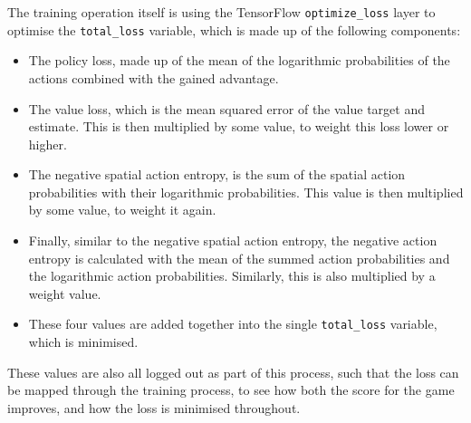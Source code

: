 The training operation itself is using the TensorFlow \texttt{optimize\_loss}
layer to optimise the \texttt{total\_loss} variable, which is made up of the
following components:

\begin{itemize}
    \item The policy loss, made up of the mean of the logarithmic probabilities of the
        actions combined with the gained advantage.
    \item The value loss, which is the mean squared error of the value target
        and estimate. This is then multiplied by some value, to weight this loss
        lower or higher.
    \item The negative spatial action entropy, is the sum of the spatial action
        probabilities with their logarithmic probabilities. This value is then
        multiplied by some value, to weight it again.
    \item Finally, similar to the negative spatial action entropy, the negative
        action entropy is calculated with the mean of the summed action
        probabilities and the logarithmic action probabilities. Similarly, this
        is also multiplied by a weight value.
    \item These four values are added together into the single
        \texttt{total\_loss} variable, which is minimised.
\end{itemize}

These values are also all logged out as part of this process, such that the loss
can be mapped through the training process, to see how both the score for the
game improves, and how the loss is minimised throughout.

